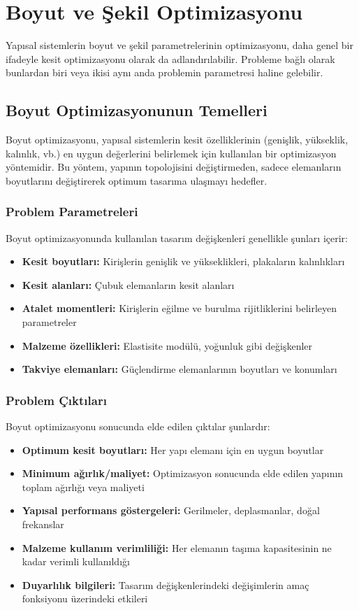 \section{Boyut ve Şekil Optimizasyonu}
Yapısal sistemlerin boyut ve şekil parametrelerinin optimizasyonu, daha genel bir ifadeyle kesit optimizasyonu olarak da adlandırılabilir. Probleme bağlı olarak bunlardan biri veya ikisi aynı anda problemin parametresi haline gelebilir.

\subsection{Boyut Optimizasyonunun Temelleri}
Boyut optimizasyonu, yapısal sistemlerin kesit özelliklerinin (genişlik, yükseklik, kalınlık, vb.) en uygun değerlerini belirlemek için kullanılan bir optimizasyon yöntemidir. Bu yöntem, yapının topolojisini değiştirmeden, sadece elemanların boyutlarını değiştirerek optimum tasarıma ulaşmayı hedefler.

\subsubsection{Problem Parametreleri}
Boyut optimizasyonunda kullanılan tasarım değişkenleri genellikle şunları içerir:
\begin{itemize}
    \item \textbf{Kesit boyutları:} Kirişlerin genişlik ve yükseklikleri, plakaların kalınlıkları
    \item \textbf{Kesit alanları:} Çubuk elemanların kesit alanları
    \item \textbf{Atalet momentleri:} Kirişlerin eğilme ve burulma rijitliklerini belirleyen parametreler
    \item \textbf{Malzeme özellikleri:} Elastisite modülü, yoğunluk gibi değişkenler
    \item \textbf{Takviye elemanları:} Güçlendirme elemanlarının boyutları ve konumları
\end{itemize}

\subsubsection{Problem Çıktıları}
Boyut optimizasyonu sonucunda elde edilen çıktılar şunlardır:
\begin{itemize}
    \item \textbf{Optimum kesit boyutları:} Her yapı elemanı için en uygun boyutlar
    \item \textbf{Minimum ağırlık/maliyet:} Optimizasyon sonucunda elde edilen yapının toplam ağırlığı veya maliyeti
    \item \textbf{Yapısal performans göstergeleri:} Gerilmeler, deplasmanlar, doğal frekanslar
    \item \textbf{Malzeme kullanım verimliliği:} Her elemanın taşıma kapasitesinin ne kadar verimli kullanıldığı
    \item \textbf{Duyarlılık bilgileri:} Tasarım değişkenlerindeki değişimlerin amaç fonksiyonu üzerindeki etkileri
\end{itemize}

